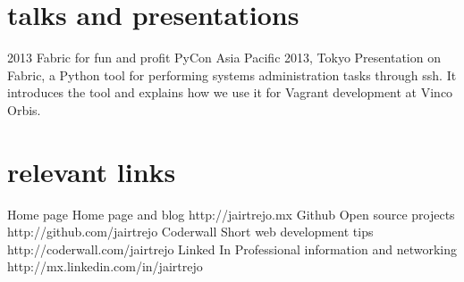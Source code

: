 \documentclass[]{friggeri-cv} %
\begin{document}
\begin{entrylist}

\end{entrylist}


\section{talks and presentations}

\begin{entrylist}
\entry
{2013}
{Fabric for fun and profit}
{PyCon Asia Pacific 2013, Tokyo}
{Presentation on Fabric, a Python tool for performing systems administration tasks through ssh. It introduces the tool and explains how we use it for Vagrant development at Vinco Orbis.}
\end{entrylist}


\section{relevant links}

\begin{entrylist}
\entry
{Home page}
{Home page and blog}
{}
{http://jairtrejo.mx}
\entry
{Github}
{Open source projects}
{}
{http://github.com/jairtrejo}
\entry
{Coderwall}
{Short web development tips}
{}
{http://coderwall.com/jairtrejo}
\entry
{Linked In}
{Professional information and networking}
{}
{http://mx.linkedin.com/in/jairtrejo}
\end{entrylist}

\end{document}
